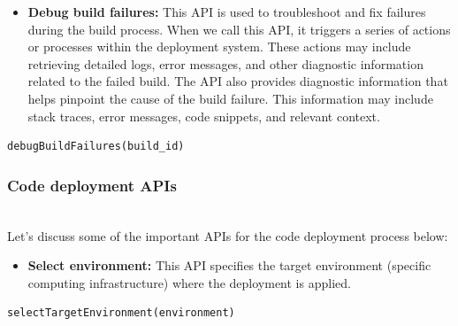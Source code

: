 \begin{itemize}
\item
\protect{}\label{hbnDp2mQ82C_Ly60rMV4v}
\textbf{Debug build failures:} This API is used to troubleshoot and fix failures during the build process. When we call this API, it triggers a series of actions or processes within the deployment system. These actions may include retrieving detailed logs, error messages, and other diagnostic information related to the failed build. The API also provides diagnostic information that helps pinpoint the cause of the build failure. This information may include stack traces, error messages, code snippets, and relevant context.
\end{itemize}

\begin{lstlisting}[language=c++17]
debugBuildFailures(build_id)
\end{lstlisting}

\begin{table}[htbp]
\centering
\small
{}
\end{table}

\subsubsection{Code deployment APIs}\label{KPjuU6MdiWJwZixdNQvpF}
\\
Let's discuss some of the important APIs for the code deployment process below:

\begin{itemize}
\item
\protect{}\label{rMu6QxKTPOACgXQztnM3W}
\textbf{Select environment:} This API specifies the target environment (specific computing infrastructure) where the deployment is applied.
\end{itemize}

\begin{lstlisting}[language=c++17]
selectTargetEnvironment(environment)
\end{lstlisting}

\begin{table}[htbp]
\centering
\small
{}
\end{table}

